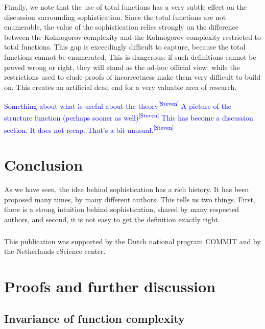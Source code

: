 \documentclass{style/llncs}
\newcommand{\sdr}[1]{\textcolor{blue}{\small #1\textsuperscript{[Steven]} }}
\begin{document}
Finally, we note that the use of total functions has a very subtle effect on the discussion surrounding sophistication. Since the total functions are not enumerable, the value of the sophistication relies strongly on the difference between the Kolmogorov complexity and the Kolmogorov complexity restricted to total functions. This gap is exceedingly difficult to capture, because the total functions cannot be enumerated. This is dangerous: if such definitions cannot be proved wrong or right, they will stand as the ad-hoc official view, while the restrictions used to elude proofs of incorrectness make them very difficult to build on. This creates an artificial dead end for a very valuable area of research. 


\sdr{Something about what is useful about the theory}
\sdr{A picture of the structure function (perhaps sooner as well)}
\sdr{This has become a discussion section. It does not recap. That's a bit unusual.}

\section{Conclusion}
As we have seen, the idea behind sophistication has a rich history. It has been proposed many times, by many different authors. This tells us two things. First, there is a strong intuition behind sophistication, shared by many respected authors, and second, it is not easy to get the definition exactly right.


\subsubsection*{\ackname}

This publication was supported by the Dutch national program COMMIT and by  the Netherlands eScience center.




\appendix

\section{Proofs and further discussion}

\subsection{Invariance of function complexity}
\end{document}

